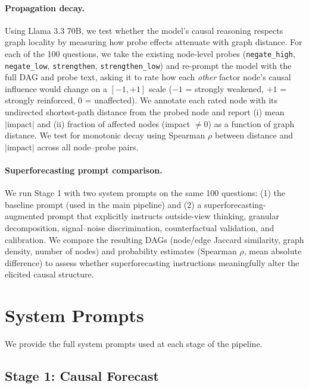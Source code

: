 \documentclass[11pt]{article}
\begin{document}
\paragraph{Propagation decay.} Using Llama 3.3 70B, we test whether the model's causal reasoning respects graph locality by measuring how probe effects attenuate with graph distance. For each of the 100 questions, we take the existing node-level probes (\texttt{negate\_high}, \texttt{negate\_low}, \texttt{strengthen}, \texttt{strengthen\_low}) and re-prompt the model with the full DAG and probe text, asking it to rate how each \emph{other} factor node's causal influence would change on a $[-1, +1]$ scale ($-1$ = strongly weakened, $+1$ = strongly reinforced, $0$ = unaffected). We annotate each rated node with its undirected shortest-path distance from the probed node and report (i) mean $|\text{impact}|$ and (ii) fraction of affected nodes (impact $\neq 0$) as a function of graph distance. We test for monotonic decay using Spearman $\rho$ between distance and $|\text{impact}|$ across all node--probe pairs.

\paragraph{Superforecasting prompt comparison.} We run Stage 1 with two system prompts on the same 100 questions: (1) the baseline prompt (used in the main pipeline) and (2) a superforecasting-augmented prompt that explicitly instructs outside-view thinking, granular decomposition, signal--noise discrimination, counterfactual validation, and calibration. We compare the resulting DAGs (node/edge Jaccard similarity, graph density, number of nodes) and probability estimates (Spearman $\rho$, mean absolute difference) to assess whether superforecasting instructions meaningfully alter the elicited causal structure.

\appendix

\section{System Prompts}
\label{app:prompts}

We provide the full system prompts used at each stage of the pipeline.

\subsection{Stage 1: Causal Forecast}
\label{app:prompt-forecast}
\end{document}

